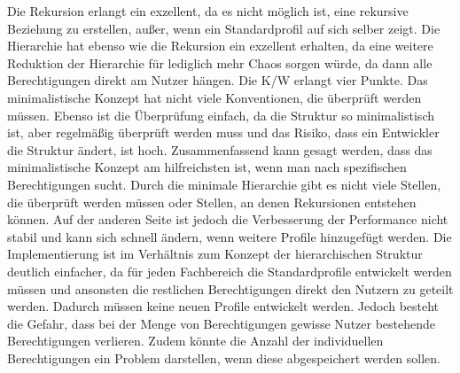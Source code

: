 Die Rekursion erlangt ein exzellent, da es nicht möglich ist, eine rekursive Beziehung zu erstellen, außer, wenn ein Standardprofil auf sich selber zeigt.
Die Hierarchie hat ebenso wie die Rekursion ein exzellent erhalten, da eine weitere Reduktion der Hierarchie für lediglich mehr Chaos sorgen würde, da dann alle Berechtigungen direkt am Nutzer hängen.
Die \ac{K/W} erlangt vier Punkte. 
Das minimalistische Konzept hat nicht viele Konventionen, die überprüft werden müssen.
Ebenso ist die Überprüfung einfach, da die Struktur so minimalistisch ist, aber regelmäßig überprüft werden muss und das Risiko, dass ein Entwickler die Struktur ändert, ist hoch.
\newline
\newline
Zusammenfassend kann gesagt werden, dass das minimalistische Konzept am hilfreichsten ist, wenn man nach spezifischen Berechtigungen sucht.
Durch die minimale Hierarchie gibt es nicht viele Stellen, die überprüft werden müssen oder Stellen, an denen Rekursionen entstehen können.
Auf der anderen Seite ist jedoch die Verbesserung der Performance nicht stabil und kann sich schnell ändern, wenn weitere Profile hinzugefügt werden.
Die Implementierung ist im Verhältnis zum Konzept der hierarchischen Struktur deutlich einfacher, da für jeden Fachbereich die Standardprofile entwickelt werden müssen und ansonsten die restlichen Berechtigungen direkt den Nutzern zu geteilt werden. Dadurch müssen keine neuen Profile entwickelt werden.
Jedoch besteht die Gefahr, dass bei der Menge von Berechtigungen gewisse Nutzer bestehende Berechtigungen verlieren.
Zudem könnte die Anzahl der individuellen Berechtigungen ein Problem darstellen, wenn diese abgespeichert werden sollen.

